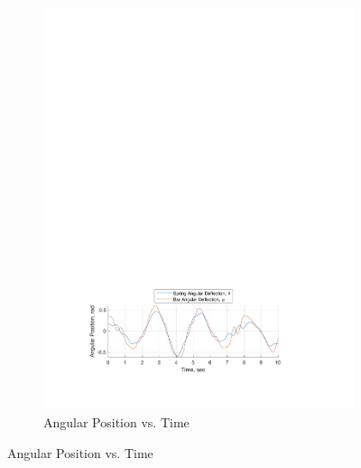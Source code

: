 \documentclass[12pt]{report}
\begin{document}
\begin{flushleft}
\begin{figure}[!htp] \ContinuedFloat
\begin{subfigure}[t]{\textwidth}
  \includegraphics[center]{angles_18-9}
  \caption{Angular Position vs. Time}
  \label{fig:angles:18-9}
\end{subfigure}
\end{figure}


\end{flushleft}
\end{document}
